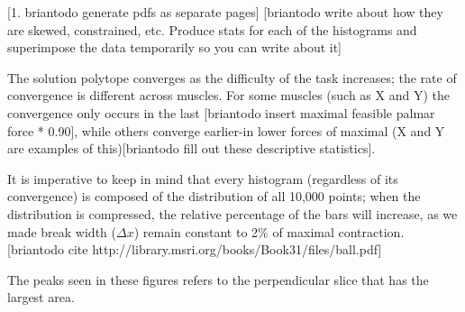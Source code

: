 [1. briantodo generate pdfs as separate pages]
[briantodo write about how they are skewed, constrained, etc. Produce stats for each of the histograms and superimpose the data temporarily so you can write about it]

The solution polytope converges as the difficulty of the task increases; the rate of convergence is different across muscles. For some muscles (such as X and Y) the convergence only occurs in the last [briantodo insert maximal feasible palmar force * 0.90], while others converge earlier-in lower forces of maximal (X and Y are examples of this)[briantodo fill out these descriptive statistics].

It is imperative to keep in mind that every histogram (regardless of its convergence) is composed of the distribution of all 10,000 points; when the distribution is compressed, the relative percentage of the bars will increase, as we made break width ($\Delta x$) remain constant to 2\% of maximal contraction. [briantodo cite http://library.msri.org/books/Book31/files/ball.pdf]

The peaks seen in these figures refers to the perpendicular slice that has the largest area. %

